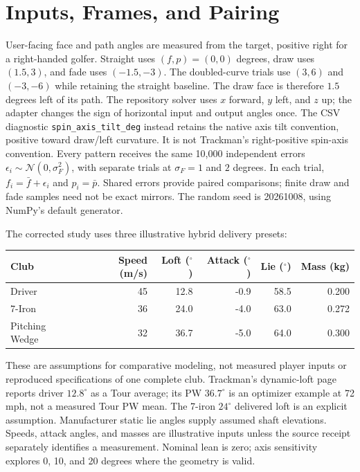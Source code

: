 \documentclass[11pt,letterpaper]{article}
\begin{document}
\section{Inputs, Frames, and Pairing}
User-facing face and path angles are measured from the target, positive right
for a right-handed golfer. Straight uses $(f,p)=(0,0)$ degrees, draw uses
$(1.5,3)$, and fade uses $(-1.5,-3)$. The doubled-curve trials
use $(3,6)$ and $(-3,-6)$ while retaining the straight baseline. The draw face is therefore $1.5$ degrees
left of its path. The repository solver uses $x$ forward, $y$ left, and $z$ up;
the adapter changes the sign of horizontal input and output angles once.
The CSV diagnostic \texttt{spin\_axis\_tilt\_deg} instead retains the native
axis tilt convention, positive toward draw/left curvature. It is not
Trackman's right-positive spin-axis convention.
Every pattern receives the same 10,000 independent errors
$\epsilon_i\sim\mathcal{N}(0,\sigma_F^2)$, with separate trials at
$\sigma_F=1$ and $2$ degrees. In each trial,
$f_i=\bar f+\epsilon_i$ and $p_i=\bar p$. Shared errors provide paired
comparisons; finite draw and fade samples need not be exact mirrors.
The random seed is 20261008, using NumPy's default generator.

The corrected study uses three illustrative hybrid delivery presets:
\begin{center}
\begin{tabular}{lrrrrr}
\toprule
Club & Speed (m/s) & Loft ($^\circ$) & Attack ($^\circ$) & Lie ($^\circ$) & Mass (kg)\\
\midrule
Driver &45&12.8&-0.9&58.5&0.200\\
7-Iron &36&24.0&-4.0&63.0&0.272\\
Pitching Wedge &32&36.7&-5.0&64.0&0.300\\
\bottomrule
\end{tabular}
\end{center}
These are assumptions for comparative modeling, not measured player inputs or
reproduced specifications of one complete club. Trackman's dynamic-loft page
reports driver $12.8^\circ$ as a Tour average; its PW $36.7^\circ$ is an
optimizer example at 72 mph, not a measured Tour PW mean. The 7-iron
$24^\circ$ delivered loft is an explicit assumption. Manufacturer static lie
angles supply assumed shaft elevations. Speeds, attack angles, and masses
are illustrative inputs unless the source receipt separately identifies a
measurement. Nominal lean is zero; axis sensitivity explores 0, 10, and
20 degrees where the geometry is valid.
\end{document}
